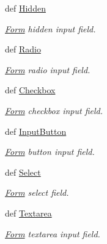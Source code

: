 \begin{DoxyCompactItemize}
def \hyperlink{namespacecore_1_1form_1_1elements_1_1basic_a85357895ece232f456a8208df8f25ec1}{Hidden}
\begin{DoxyCompactList}\small\item\em \hyperlink{classcore_1_1form_1_1Form}{Form} hidden input field. \end{DoxyCompactList}\item 
def \hyperlink{namespacecore_1_1form_1_1elements_1_1basic_a675f173f71ca07ecbd23938a50b067a9}{Radio}
\begin{DoxyCompactList}\small\item\em \hyperlink{classcore_1_1form_1_1Form}{Form} radio input field. \end{DoxyCompactList}\item 
def \hyperlink{namespacecore_1_1form_1_1elements_1_1basic_a95e0c6110dcc9148bf06aa26745f5147}{Checkbox}
\begin{DoxyCompactList}\small\item\em \hyperlink{classcore_1_1form_1_1Form}{Form} checkbox input field. \end{DoxyCompactList}\item 
def \hyperlink{namespacecore_1_1form_1_1elements_1_1basic_a91cdca5d12e71adae7a2c26f44aa65cb}{Input\-Button}
\begin{DoxyCompactList}\small\item\em \hyperlink{classcore_1_1form_1_1Form}{Form} button input field. \end{DoxyCompactList}\item 
def \hyperlink{namespacecore_1_1form_1_1elements_1_1basic_a30f888f944c5af87dcb1dd966838df79}{Select}
\begin{DoxyCompactList}\small\item\em \hyperlink{classcore_1_1form_1_1Form}{Form} select field. \end{DoxyCompactList}\item 
def \hyperlink{namespacecore_1_1form_1_1elements_1_1basic_afea8e74fd69504df28a8d906affb5843}{Textarea}
\begin{DoxyCompactList}\small\item\em \hyperlink{classcore_1_1form_1_1Form}{Form} textarea input field. \end{DoxyCompactList}\end{DoxyCompactItemize}


